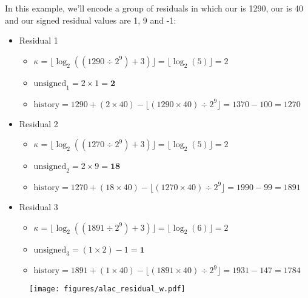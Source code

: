 In this example, we'll encode a group of residuals in which our
 is 1290, our  is 40
and our signed residual values are 1, 9 and -1:
\begin{itemize}
\setlength{\itemsep}{0in}
\setlength{\parskip}{0in}
\item Residual 1
\begin{itemize}
\item $\kappa = \lfloor\log_2((1290 \div 2^9) + 3)\rfloor = \lfloor\log_2(5)\rfloor = 2$
\item $\text{unsigned}_1 = 2 \times 1 = \textbf{2}$
\item $\text{history} = 1290 + (2 \times 40) - \lfloor (1290 \times 40) \div 2^9 \rfloor = 1370 - 100 = 1270$
\end{itemize}
\item Residual 2
\begin{itemize}
\item $\kappa = \lfloor\log_2((1270 \div 2^9) + 3)\rfloor = \lfloor\log_2(5)\rfloor = 2$
\item $\text{unsigned}_2 = 2 \times 9 = \textbf{18}$
\item $\text{history} = 1270 + (18 \times 40) - \lfloor (1270 \times 40) \div 2^9 \rfloor = 1990 - 99 = 1891$
\end{itemize}
\item Residual 3
\begin{itemize}
\item $\kappa = \lfloor\log_2((1891 \div 2^9) + 3)\rfloor = \lfloor\log_2(6)\rfloor = 2$
\item $\text{unsigned}_3 = (1 \times 2) - 1 = \textbf{1}$
\item $\text{history} = 1891 + (1 \times 40) - \lfloor (1891 \times 40) \div 2^9 \rfloor = 1931 - 147 = 1784$
\end{itemize}
\end{itemize}
\begin{figure}[h]
\texttt{[image: figures/alac\_residual\_w.pdf]}
\end{figure}
